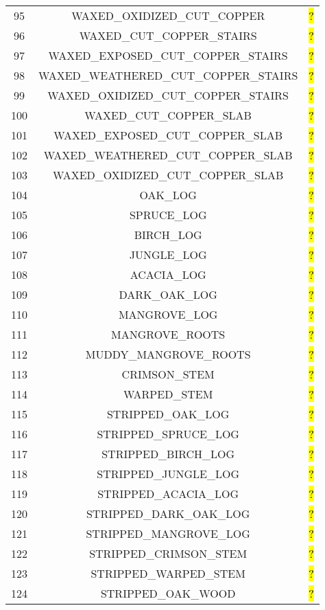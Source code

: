 \documentclass[11pt]{article}
\newcommand\myworries[1]{\sethlcolor{red}\hl{#1}}
\begin{document}
\begin{longtable}{ |c|c|c| }
95 & WAXED\_OXIDIZED\_CUT\_COPPER & \myworries{?} \\
96 & WAXED\_CUT\_COPPER\_STAIRS & \myworries{?} \\
97 & WAXED\_EXPOSED\_CUT\_COPPER\_STAIRS & \myworries{?} \\
98 & WAXED\_WEATHERED\_CUT\_COPPER\_STAIRS & \myworries{?} \\
99 & WAXED\_OXIDIZED\_CUT\_COPPER\_STAIRS & \myworries{?} \\
100 & WAXED\_CUT\_COPPER\_SLAB & \myworries{?} \\
101 & WAXED\_EXPOSED\_CUT\_COPPER\_SLAB & \myworries{?} \\
102 & WAXED\_WEATHERED\_CUT\_COPPER\_SLAB & \myworries{?} \\
103 & WAXED\_OXIDIZED\_CUT\_COPPER\_SLAB & \myworries{?} \\
104 & OAK\_LOG & \myworries{?} \\
105 & SPRUCE\_LOG & \myworries{?} \\
106 & BIRCH\_LOG & \myworries{?} \\
107 & JUNGLE\_LOG & \myworries{?} \\
108 & ACACIA\_LOG & \myworries{?} \\
109 & DARK\_OAK\_LOG & \myworries{?} \\
110 & MANGROVE\_LOG & \myworries{?} \\
111 & MANGROVE\_ROOTS & \myworries{?} \\
112 & MUDDY\_MANGROVE\_ROOTS & \myworries{?} \\
113 & CRIMSON\_STEM & \myworries{?} \\
114 & WARPED\_STEM & \myworries{?} \\
115 & STRIPPED\_OAK\_LOG & \myworries{?} \\
116 & STRIPPED\_SPRUCE\_LOG & \myworries{?} \\
117 & STRIPPED\_BIRCH\_LOG & \myworries{?} \\
118 & STRIPPED\_JUNGLE\_LOG & \myworries{?} \\
119 & STRIPPED\_ACACIA\_LOG & \myworries{?} \\
120 & STRIPPED\_DARK\_OAK\_LOG & \myworries{?} \\
121 & STRIPPED\_MANGROVE\_LOG & \myworries{?} \\
122 & STRIPPED\_CRIMSON\_STEM & \myworries{?} \\
123 & STRIPPED\_WARPED\_STEM & \myworries{?} \\
124 & STRIPPED\_OAK\_WOOD & \myworries{?} \\

\end{longtable}
\end{document}
